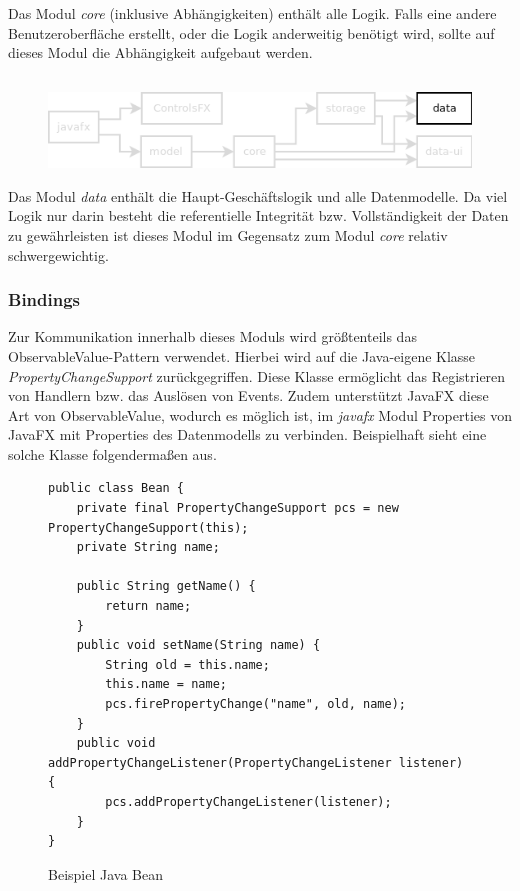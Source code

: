 Das Modul \textit{core} (inklusive Abhängigkeiten) enthält alle Logik. Falls eine andere Benutzeroberfläche erstellt,
oder die Logik anderweitig benötigt wird, sollte auf dieses Modul die Abhängigkeit aufgebaut werden.




\subsection{\textModData}
\label{\textModData}
\begin{figure}[h!]
	\centering
	\includegraphics[width=.8\textwidth]{module_dependencies_data.png}
\end{figure}

Das Modul \textit{data} enthält die Haupt-Geschäftslogik und alle Datenmodelle. Da viel Logik nur darin besteht
die referentielle Integrität bzw. Vollständigkeit der Daten zu gewährleisten ist dieses Modul im Gegensatz zum
Modul \textit{core} relativ schwergewichtig.

\subsubsection{Bindings}
Zur Kommunikation innerhalb dieses Moduls wird größtenteils das ObservableValue-Pattern verwendet. Hierbei wird auf
die Java-eigene Klasse \textit{PropertyChangeSupport} zurückgegriffen. Diese Klasse ermöglicht das Registrieren
von Handlern bzw. das Auslösen von Events. Zudem unterstützt JavaFX diese Art von ObservableValue, wodurch es
möglich ist, im \textit{javafx} Modul Properties von JavaFX mit Properties des Datenmodells zu verbinden. Beispielhaft
sieht eine solche Klasse folgendermaßen aus.

\begin{figure}[h!]
	\centering
	\begin{lstlisting}
public class Bean {
    private final PropertyChangeSupport pcs = new PropertyChangeSupport(this);
    private String name;

    public String getName() {
    	return name;
    }
    public void setName(String name) {
    	String old = this.name;
    	this.name = name;
    	pcs.firePropertyChange("name", old, name);
    }
    public void addPropertyChangeListener(PropertyChangeListener listener) {
    	pcs.addPropertyChangeListener(listener);
    }
}
	\end{lstlisting}
	\caption{Beispiel Java Bean}
\end{figure}

